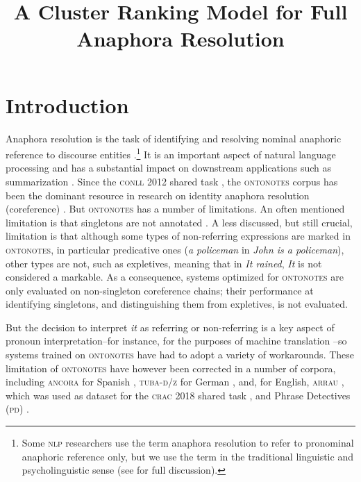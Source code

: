 \documentclass[10pt, a4paper]{article}
\title{A Cluster Ranking Model for Full Anaphora Resolution}
\newcommand{\ACRO}[1]{\textsc{#1}}
\newcommand{\ARRAU}{\ACRO{arrau}}
\newcommand{\CONLL}{\ACRO{conll}}
\newcommand{\CRAC}{\ACRO{crac}}
\newcommand{\PD}{\ACRO{pd}}
\newcommand{\pdfull}{Phrase Detectives}
\newcommand{\NLP}{\ACRO{nlp}}
\newcommand{\ONTONOTES}{\ACRO{ontonotes}}
\begin{document}
\maketitleabstract

\section{Introduction}

Anaphora resolution 
is the task of identifying and resolving nominal anaphoric reference to discourse entities \cite{poesio-stuckardt-versley:book}.\footnote{Some {\NLP} researchers use the term anaphora resolution to refer to pronominal anaphoric reference only, but we use the term in the traditional linguistic and psycholinguistic sense (see \cite{poesio-stuckardt-versley:book} for full discussion).
}
It is an important aspect of natural language processing and has a substantial impact on  downstream applications such as 
summarization \cite{steinberger-et-al:IPM07,steinberger-et-al:ana_book_summarization}.
Since the {\CONLL} 2012 shared task \cite{pradhan2012conllst},  the {\ONTONOTES} corpus has been the dominant resource in research on identity anaphora resolution (coreference) \cite{fernandes-et-al:CL14,bjorkelund2014learning,martschat&strube:TACL15,clark2015entity,clark2016deep,clark2016improving,lee2017end,lee2018higher,kantor2019bertee,joshi2019bert,joshi2019spanbert}.
But {\ONTONOTES} has a number of limitations.
An often mentioned limitation
is that singletons are not annotated \cite{DeMarneffe:2015:MLD:2831407.2831417,chen-EtAl:2018:EMNLP2}. 
A less discussed, but still crucial, limitation is that 
although some types of non-referring expressions are marked in {\ONTONOTES}, in particular predicative ones (\textit{a policeman} in \textit{John is a policeman}), 
other types are not, 
such as expletives, 
meaning that in \textit{It rained}, \textit{It} 
is not 
considered a markable. 
As a consequence, 
systems optimized for 
{\ONTONOTES} are only evaluated on non-singleton coreference chains; their performance at identifying  singletons,  and 
distinguishing them from expletives, is not evaluated.

But the decision to interpret \textit{it} as referring or non-referring \cite{Uryupina-et-al:ana_book_non_referring,versley-EtAl:2008:PAPERS,bergsma-lin-goebel:2008:ACLMain,Bergsma:2011:nada,hardmeier-EtAl:2015:DiscoMT}  is a key aspect of pronoun interpretation--for instance, for the purposes of machine translation \cite{GUILLOU16.327}--so systems trained on {\ONTONOTES} have had to adopt a variety of workarounds.
These  limitation of {\ONTONOTES} have however been 
corrected
in a number of corpora, including \ACRO{ancora} for Spanish \cite{taule-et-al:2008:ancora}, \ACRO{tuba-d/z} for German \cite{telljohann2006stylebook}, and, for English, {\ARRAU}  \cite{uryupina-et-al:NLEJ}, 
which 
was used as dataset for the {\CRAC} 2018 shared task 
\cite{poesio2018crac}, 
and {\pdfull} ({\PD}) \cite{poesio-etal-2019-crowdsourced}. 
\end{document}
